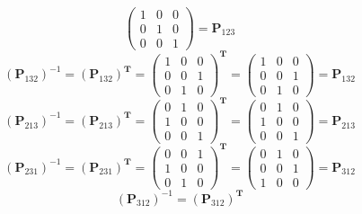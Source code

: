 \documentclass[oneside]{book}
\begin{document}
{{$$            \begin{pmatrix}
                1 & 0 & 0\\
                0 & 1 & 0\\
                0 & 0 & 1
            \end{pmatrix}
            =
            \mathbf{P}_{123}$$
        $$(\mathbf{P}_{132})^{-1}=(\mathbf{P}_{132})^{\mathbf{T}}
            =
            \begin{pmatrix}
                1 & 0 & 0\\
                0 & 0 & 1\\
                0 & 1 & 0
            \end{pmatrix}^{\mathbf{T}}
            =
            \begin{pmatrix}
                1 & 0 & 0\\
                0 & 0 & 1\\
                0 & 1 & 0
            \end{pmatrix}
            =
            \mathbf{P}_{132}$$
        $$(\mathbf{P}_{213})^{-1}=(\mathbf{P}_{213})^{\mathbf{T}}
            =
            \begin{pmatrix}
                0 & 1 & 0\\
                1 & 0 & 0\\
                0 & 0 & 1
            \end{pmatrix}^{\mathbf{T}}
            =
            \begin{pmatrix}
                0 & 1 & 0\\
                1 & 0 & 0\\
                0 & 0 & 1
            \end{pmatrix}
            =
            \mathbf{P}_{213}$$
        $$(\mathbf{P}_{231})^{-1}=(\mathbf{P}_{231})^{\mathbf{T}}
            =
            \begin{pmatrix}
                0 & 0 & 1\\
                1 & 0 & 0\\
                0 & 1 & 0
            \end{pmatrix}^{\mathbf{T}}
            =
            \begin{pmatrix}
                0 & 1 & 0\\
                0 & 0 & 1\\
                1 & 0 & 0
            \end{pmatrix}
            =
            \mathbf{P}_{312}$$
        $$(\mathbf{P}_{312})^{-1}=(\mathbf{P}_{312})^{\mathbf{T}}
$$}}
\end{document}
